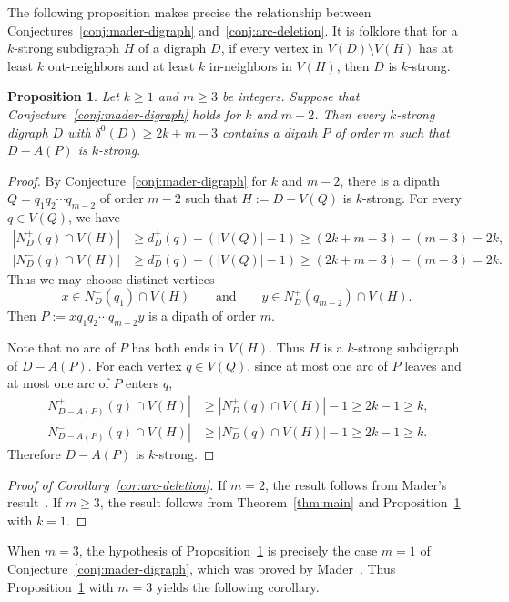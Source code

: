 \documentclass[12pt]{article}
\numberwithin{equation}{section}
\theoremstyle{plain}
\newtheorem{proposition}[theorem]{Proposition}
\theoremstyle{definition}
\begin{document}
The following proposition makes precise the relationship between Conjectures~\ref{conj:mader-digraph} and~\ref{conj:arc-deletion}.
It is folklore that for a $k$-strong subdigraph $H$ of a digraph $D$, if every vertex in $V(D)\setminus V(H)$ has at least $k$ out-neighbors and at least $k$ in-neighbors in $V(H)$, then $D$ is $k$-strong.

\begin{proposition}\label{prop:arc-deletion}
Let $k\ge1$ and $m\ge3$ be integers. 
Suppose that Conjecture~\ref{conj:mader-digraph} holds for $k$ and $m-2$.
Then every $k$-strong digraph $D$ with $\delta^0(D)\ge 2k+m-3$ contains a dipath $P$ of order $m$ such that $D-A(P)$ is $k$-strong.
\end{proposition}

\begin{proof}
By Conjecture~\ref{conj:mader-digraph} for $k$ and $m-2$, there is a dipath $Q=q_1q_2\cdots q_{m-2}$ of order $m-2$ such that $H:=D-V(Q)$ is $k$-strong.
For every $q\in V(Q)$, we have
\[
\begin{aligned}
|N_D^+(q)\cap V(H)|
 &\ge d_D^+(q)-(|V(Q)|-1)\ge (2k+m-3)-(m-3)=2k,\\
|N_D^-(q)\cap V(H)|
 &\ge d_D^-(q)-(|V(Q)|-1)\ge (2k+m-3)-(m-3)=2k.
\end{aligned}
\]
Thus we may choose distinct vertices
\[
x\in N_D^-(q_1)\cap V(H)
\qquad\text{and}\qquad
y\in N_D^+(q_{m-2})\cap V(H).
\]
Then $P:=xq_1q_2\cdots q_{m-2}y$ is a dipath of order $m$.

Note that no arc of $P$ has both ends in $V(H)$. 
Thus $H$ is a $k$-strong subdigraph of $D-A(P)$.
For each vertex $q \in V(Q)$, since at most one arc of $P$ leaves and at most one arc of $P$ enters $q$, 
\[
\begin{aligned}
|N_{D-A(P)}^+(q)\cap V(H)|
&\ge |N_D^+(q)\cap V(H)|-1\ge 2k-1\ge k,\\
|N_{D-A(P)}^-(q)\cap V(H)|
 &\ge |N_D^-(q)\cap V(H)|-1\ge 2k-1\ge k.
\end{aligned}
\]
Therefore $D-A(P)$ is $k$-strong.
\end{proof}


\begin{proof}[Proof of Corollary~\ref{cor:arc-deletion}]
If $m=2$, the result follows from Mader's result~\cite{Mader85}.
If $m\ge3$, the result follows from Theorem~\ref{thm:main} and Proposition~\ref{prop:arc-deletion} with $k=1$.
\end{proof}

When $m=3$, the hypothesis of Proposition~\ref{prop:arc-deletion} is precisely the case $m=1$ of Conjecture~\ref{conj:mader-digraph}, which was proved by Mader~\cite{Mader91}.
Thus Proposition~\ref{prop:arc-deletion} with $m=3$ yields the following corollary.
\end{document}
